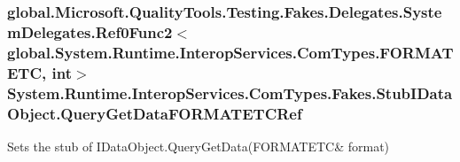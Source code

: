 \hypertarget{class_system_1_1_runtime_1_1_interop_services_1_1_com_types_1_1_fakes_1_1_stub_i_data_object_ae7dd37d4b511d29eb57704d2013fee08}{
\subsubsection[{Query\-Get\-Data\-F\-O\-R\-M\-A\-T\-E\-T\-C\-Ref}]{\setlength{\rightskip}{0pt plus 5cm}global.\-Microsoft.\-Quality\-Tools.\-Testing.\-Fakes.\-Delegates.\-System\-Delegates.\-Ref0\-Func2$<$global.\-System.\-Runtime.\-Interop\-Services.\-Com\-Types.\-F\-O\-R\-M\-A\-T\-E\-T\-C, int$>$ System.\-Runtime.\-Interop\-Services.\-Com\-Types.\-Fakes.\-Stub\-I\-Data\-Object.\-Query\-Get\-Data\-F\-O\-R\-M\-A\-T\-E\-T\-C\-Ref}}\label{class_system_1_1_runtime_1_1_interop_services_1_1_com_types_1_1_fakes_1_1_stub_i_data_object_ae7dd37d4b511d29eb57704d2013fee08}


Sets the stub of I\-Data\-Object.\-Query\-Get\-Data(F\-O\-R\-M\-A\-T\-E\-T\-C\& format)

